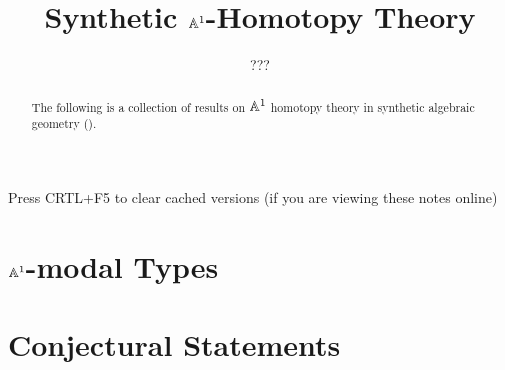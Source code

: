 \documentclass{../util/zariski}
\title{Synthetic $\mathbb{A}^1$-Homotopy Theory}
\author{???}
\begin{document}
\maketitle

\begin{center}
  \color{purple}
  \large{Press CRTL+F5 to clear cached versions}
  \large{(if you are viewing these notes online)}
\end{center}

\begin{abstract}
  The following is a collection of results on $\mathbb{A}^1$ homotopy theory in synthetic algebraic geometry (\cite{draft}).
\end{abstract}

\tableofcontents

\section{$\mathbb{A}^1$-modal Types}


\section{Conjectural Statements}


\printindex

\printbibliography
\end{document}
